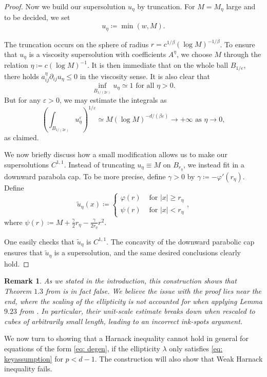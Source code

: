 \documentclass[reqno]{amsart}
\numberwithin{equation}{section}
\newtheorem{preremark}[thm]{Remark}
\newenvironment{remark}{\begin{preremark}\rm}{\medskip \end{preremark}}
\numberwithin{equation}{section}
\newcommand{\eps}{\varepsilon}
\newcommand{\vphi}{\varphi}
\newcommand{\ds}{\displaystyle}
\newcounter{case}
\begin{document}
\begin{proof}
Now we build our supersolution $u_\eta$ by truncation. For $M= M_\eta$ large and to be decided, we set
$$u_\eta  \coloneqq \min(w,M).$$

The truncation occurs on the sphere of radius $r =  c^{1/\beta}(\log M)^{-1/\beta}$. To ensure that $u_\eta$ is a viscosity supersolution with coefficients $A^\eta$, we choose $M$ through the relation $\eta \coloneqq c (\log M)^{-1}$. It is then immediate that on the whole ball $B_{1/e}$, there holds $a_{ij}^\eta \partial_{ij}u_\eta \le 0$ in the viscosity sense. It is also clear that
$$\inf_{B_{1/(2e)}} u_\eta  \simeq 1 \text{ for all  } \eta >0.$$
But for any $\eps > 0$, we may estimate the integrals as
 $$\left(\int_{B_{1/(2e)}} u_\eta^\eps\right)^{1/\eps} \simeq M (\log M)^{-d/(\beta \eps)} \to + \infty \text{ as } \eta \to 0,$$
 as claimed.


We now briefly discuss how a small modification allows us to make our supersolutions $C^{1,1}$. Instead of truncating $u_\eta \equiv M$ on $B_{r_\eta}$, we instead fit in a downward parabola cap. To be more precise, define $\gamma>0$ by $\gamma \coloneqq -\vphi'(r_\eta)$. Define $$\tilde{u}_\eta(x) \coloneqq \begin{cases} \vphi(r) & \text{ for }|x| \ge r_\eta \\ \psi(r) & \text{ for }|x|<r_\eta\end{cases},$$ where $\psi(r)\ds \coloneqq M + \frac{\gamma}{2} r_\eta - \frac{\gamma}{2r_\eta} r^2.$

One easily checks that $\tilde{u}_\eta$ is $C^{1,1}$. The concavity of the downward parabolic cap ensures that $\tilde{u}_\eta$ is a supersolution, and the same desired conclusions clearly hold.
\end{proof}
\begin{remark}
As we stated in the introduction, this construction shows that Theorem $1.3$ from \cite{KimLee2025} is in fact false. We believe the issue with the proof lies near the end, where the scaling of the ellipticity is not accounted for when applying Lemma $9.23$ from \cite{GilbargTrudinger2001}. In particular, their unit-scale estimate breaks down when rescaled to cubes of arbitrarily small length, leading to an incorrect ink-spots argument.
\end{remark}
We now turn to showing that a Harnack inequality cannot hold in general for equations of the form \eqref{eq: degen}, if the ellipticity $\lambda$ only satisfies \eqref{eq: keyassumption} for $p<d-1$. The construction will also show that Weak Harnack inequality fails.
\end{document}

